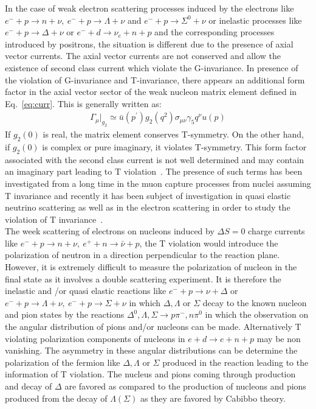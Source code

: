  In the case of weak electron scattering processes induced by the electrons like  $e^-+p\rightarrow n+\nu,~ e^-+p\rightarrow\Lambda+\nu$ and $e^-+p\rightarrow \Sigma^0+\nu$ or inelastic processes like $e^-+p\rightarrow \Delta+\nu$ or $e^-+d\rightarrow \nu_e+n+p$ and the corresponding processes introduced by positrons, the situation is different due to the presence of axial vector currents. The axial vector currents are not conserved and allow the existence of second class current which violate the G-invariance. In presence of the violation of G-invariance and T-invariance, there appears an additional form factor in the axial vector sector of the weak nucleon matrix element defined in Eq.~\ref{eq:curr}. This is generally written as: 
 \begin{align}
   \Gamma_\mu|_{g_2} \simeq  \bar u(p^\prime) g_2(q^2) \sigma_{\mu \nu} \gamma_5 q^\nu u(p)
 \end{align}
 If $g_2(0)$ is real, the matrix element conserves T-symmetry. 
On the other hand, if  $g_2(0)$ is complex or pure imaginary, it violates T-symmetry. 
 This form factor associated with the second class current is not well determined and may contain an imaginary part leading to T violation~\cite{Athar:1970esm}. The presence of such terms has been investigated from a long time in the muon capture processes from nuclei assuming T invariance and recently it has been subject of investigation in quasi elastic neutrino scattering as well as in the electron scattering in order to study the violation of T invariance~\cite{Fatima:2018tzs,Fatima:2018gjy}.\\
 
    The week scattering of electrons on nucleons induced by $\Delta S=0$ charge currents like $e^-+p\rightarrow n+\nu,~ e^++n\rightarrow \bar{\nu}+p$, the T violation would introduce the polarization of neutron in a direction perpendicular to the reaction plane. However, it is extremely difficult to measure the polarization of nucleon in the final state as  it involves a double scattering experiment. It is therefore the inelastic and /or quasi elastic reactions like $e^-+p\rightarrow \nu+\Delta$ or $ e^-+p\rightarrow \Lambda
    +\nu,~ e^-+p\rightarrow \Sigma+\nu$ in which $\Delta, \Lambda$ or $ \Sigma$ decay to the known nucleon and pion states by the reactions $\Delta^0,\Lambda,\Sigma\rightarrow p\pi^-,n\pi^0$ in which the observation on the angular distribution of pions and/or nucleons can be made. Alternatively T violating polarization components of nucleons in $e+d\rightarrow e+n+p$ may be non vanishing. The asymmetry in these angular distributions can be determine the polarization of the fermion like $\Delta,\Lambda$ or $\Sigma$ produced in the reaction leading to the information of T violation. The nucleus and pions coming through production and decay  of $\Delta$ are favored as compared to the production of nucleons and pions produced from the decay of $\Lambda(\Sigma)$ as they are favored by Cabibbo theory.\\
    
